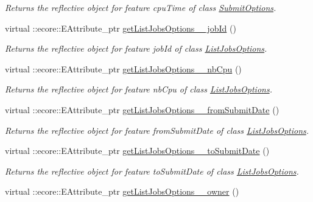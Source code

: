 \begin{DoxyCompactItemize}
\begin{DoxyCompactList}\small\item\em Returns the reflective object for feature cpuTime of class \hyperlink{classTMS__Data_1_1SubmitOptions}{SubmitOptions}. \item\end{DoxyCompactList}\item 
virtual ::ecore::EAttribute\_\-ptr \hyperlink{classTMS__Data_1_1TMS__DataPackage_a836bf7bcb1c7b05a2e70b9d92acec627}{getListJobsOptions\_\-\_\-jobId} ()
\begin{DoxyCompactList}\small\item\em Returns the reflective object for feature jobId of class \hyperlink{classTMS__Data_1_1ListJobsOptions}{ListJobsOptions}. \item\end{DoxyCompactList}\item 
virtual ::ecore::EAttribute\_\-ptr \hyperlink{classTMS__Data_1_1TMS__DataPackage_a8485240fcebcea182fee3ca7e5147cfd}{getListJobsOptions\_\-\_\-nbCpu} ()
\begin{DoxyCompactList}\small\item\em Returns the reflective object for feature nbCpu of class \hyperlink{classTMS__Data_1_1ListJobsOptions}{ListJobsOptions}. \item\end{DoxyCompactList}\item 
virtual ::ecore::EAttribute\_\-ptr \hyperlink{classTMS__Data_1_1TMS__DataPackage_ac6e114285721015109876f7ca4d2371e}{getListJobsOptions\_\-\_\-fromSubmitDate} ()
\begin{DoxyCompactList}\small\item\em Returns the reflective object for feature fromSubmitDate of class \hyperlink{classTMS__Data_1_1ListJobsOptions}{ListJobsOptions}. \item\end{DoxyCompactList}\item 
virtual ::ecore::EAttribute\_\-ptr \hyperlink{classTMS__Data_1_1TMS__DataPackage_a7939ede355dac3af4c013e1e35aaabbd}{getListJobsOptions\_\-\_\-toSubmitDate} ()
\begin{DoxyCompactList}\small\item\em Returns the reflective object for feature toSubmitDate of class \hyperlink{classTMS__Data_1_1ListJobsOptions}{ListJobsOptions}. \item\end{DoxyCompactList}\item 
virtual ::ecore::EAttribute\_\-ptr \hyperlink{classTMS__Data_1_1TMS__DataPackage_ad68e59e09dad8e462775097bef44507a}{getListJobsOptions\_\-\_\-owner} ()

\end{DoxyCompactItemize}
